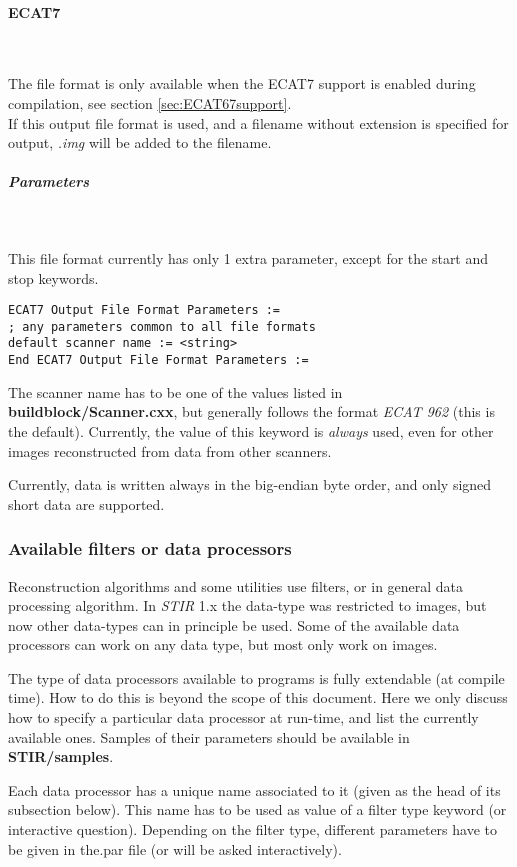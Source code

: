 \documentclass{article}
\newcommand{\subsubsubsection}[1]{\paragraph{#1}\mbox{} \\}
\newcommand{\subsubsubsubsection}[1]{\subparagraph{#1} \mbox{} \\}
\begin{document}
{{ \subsubsubsection{ECAT7}
}
The file format is only available when the ECAT7 support is enabled 
during compilation, see section \ref{sec:ECAT67support}.\\
If this output file format is used, and a filename without extension 
is specified for output, \textit{.img} will be added to the filename.

{ \subsubsubsubsection{Parameters}
}
This file format currently has only 1 extra parameter, except 
for the start and stop keywords.

\begin{verbatim}
ECAT7 Output File Format Parameters :=
; any parameters common to all file formats
default scanner name := <string>
End ECAT7 Output File Format Parameters :=
\end{verbatim}

The scanner name has to be one of the values listed in \textbf{buildblock/Scanner.cxx}, 
but generally follows the format \textit{ECAT 962} (this is the default). 
Currently, the value of this keyword is \textit{always} used, even 
for other images reconstructed from data from other scanners.


Currently, data is written always in the big-endian byte order, 
and only signed short data are supported.



\subsubsection{
Available filters or data processors}
\label{sec:filters}
Reconstruction algorithms and some utilities use filters, or in 
general data processing algorithm. In \textit{STIR} 1.x the data-type was restricted
to images, but now other data-types can in principle be used. Some
of the available data processors can work on any data type, but most
only work on images.

The type of data processors 
available to programs is fully extendable (at compile time). 
How to do this is beyond the scope of this document. Here we 
only discuss how to specify a particular data processor at run-time, 
and list the currently available ones. Samples of their parameters 
should be available in \textbf{STIR/samples}.


Each data processor has a unique name associated to it (given 
as the head of its subsection below). This name has to be used 
as value of a filter type keyword (or interactive question). 
Depending on the filter type, different parameters have to be 
given in the.par file (or will be asked interactively).


}
\end{document}

